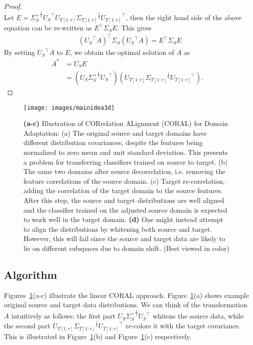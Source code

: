 \documentclass[graybox]{svmult}
\begin{document}
\begin{proof}
\begin{equation*}
\end{equation*}
Let $E ={\Sigma_S^{+}}^{\frac{1}{2}} {U_S}^{\top} {U_{T[1:r]}} {\Sigma_{T[1:r]}}^{\frac{1}{2}}{U_{T[1:r]}}^{\top}$, then the right hand side of the above equation can be re-written as ${E}^{\top}{\Sigma_S}E$. This gives
\begin{align*}
&{({U_S}^{\top}A)}^{\top}{\Sigma_S}({U_S}^{\top}{A})= {E}^{\top}{\Sigma_S}E
\end{align*}
By setting ${U_S}^{\top}A$ to $E$, we obtain the optimal solution of $A$ as 
\begin{equation} 
\begin{aligned}
A^{*}&={U_S}E\\
&=(U_{S}{\Sigma_S^{+}}^{\frac{1}{2}}{U_{S}}^{\top})(U_{T[1:r]}{\Sigma_{T[1:r]}}^{\frac{1}{2}}{U_{T[1:r]}}^{\top}).\end{aligned}
\label{eq:slu}
\end{equation}
\end{proof}

\begin{figure}[t]
\centering
\texttt{[image: images/mainidea3d]}
\caption{\small \textbf{(a-c)} Illustration of CORrelation ALignment (CORAL) for Domain Adaptation: (a) The original source and target domains have different distribution covariances, despite the features being normalized to zero mean and unit standard deviation. This presents a problem for transferring classifiers trained on source to target. (b) The same two domains after source decorrelation, i.e. removing the feature correlations of the source domain. (c) Target re-correlation, adding the correlation of the target domain to the source features. After this step, the source and target distributions are well aligned and the classifier trained on the adjusted source domain is expected to work well in the target domain. \textbf{(d)} One might instead attempt to align the distributions by whitening both source and target. However, this will fail since the source and target data are likely to lie on different subspaces due to domain shift. (Best viewed in color)}
\label{fig:variance}
\end{figure}

\subsection{Algorithm}
\label{subsec:algo}
Figures~\ref{fig:variance}(a-c) illustrate the linear CORAL approach. Figure~\ref{fig:variance}(a) shows example original source and target data distributions. We can think of the transformation $A$ intuitively as follows: the first part $U_{S}{\Sigma_S^{+}}^{\frac{1}{2}}{U_{S}}^{\top}$ whitens the source data, while the second part $U_{T[1:r]}{\Sigma_{T[1:r]}}^{\frac{1}{2}}{U_{T[1:r]}}^{\top}$ re-colors it with the target covariance. This is illustrated in Figure~\ref{fig:variance}(b) and Figure~\ref{fig:variance}(c) respectively.
\end{document}
